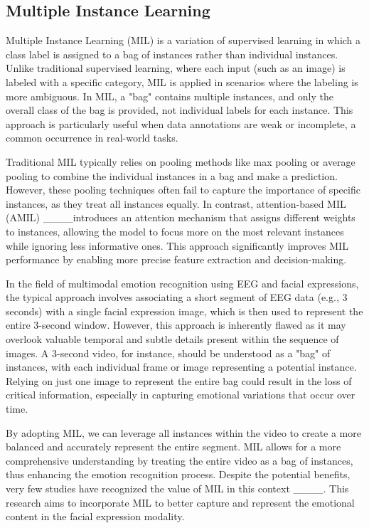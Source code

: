 \subsection{Multiple Instance Learning}
Multiple Instance Learning (MIL) is a variation of supervised learning in which a class label is assigned to a bag of instances rather than individual instances. Unlike traditional supervised learning, where each input (such as an image) is labeled with a specific category, MIL is applied in scenarios where the labeling is more ambiguous. In MIL, a "bag" contains multiple instances, and only the overall class of the bag is provided, not individual labels for each instance. This approach is particularly useful when data annotations are weak or incomplete, a common occurrence in real-world tasks.

Traditional MIL typically relies on pooling methods like max pooling or average pooling to combine the individual instances in a bag and make a prediction. However, these pooling techniques often fail to capture the importance of specific instances, as they treat all instances equally. In contrast, attention-based MIL (AMIL) ____introduces an attention mechanism that assigns different weights to instances, allowing the model to focus more on the most relevant instances while ignoring less informative ones. This approach significantly improves MIL performance by enabling more precise feature extraction and decision-making.

In the field of multimodal emotion recognition using EEG and facial expressions, the typical approach involves associating a short segment of EEG data (e.g., 3 seconds) with a single facial expression image, which is then used to represent the entire 3-second window. However, this approach is inherently flawed as it may overlook valuable temporal and subtle details present within the sequence of images. A 3-second video, for instance, should be understood as a "bag" of instances, with each individual frame or image representing a potential instance. Relying on just one image to represent the entire bag could result in the loss of critical information, especially in capturing emotional variations that occur over time.

By adopting MIL, we can leverage all instances within the video to create a more balanced and accurately represent the entire segment. MIL allows for a more comprehensive understanding by treating the entire video as a bag of instances, thus enhancing the emotion recognition process. Despite the potential benefits, very few studies have recognized the value of MIL in this context ____. This research aims to incorporate MIL to better capture and represent the emotional content in the facial expression modality.


